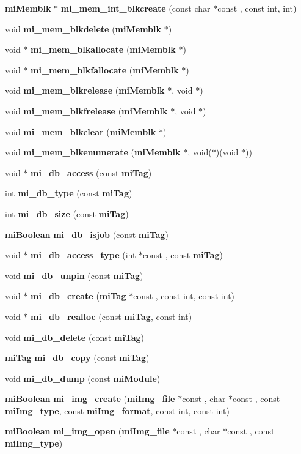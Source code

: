\begin{CompactItemize}
\item 
{\bf mi\-Memblk} $\ast$ {\bf mi\_\-mem\_\-int\_\-blkcreate} (const char $\ast$const , const int, int)
\item 
void {\bf mi\_\-mem\_\-blkdelete} ({\bf mi\-Memblk} $\ast$)
\item 
void $\ast$ {\bf mi\_\-mem\_\-blkallocate} ({\bf mi\-Memblk} $\ast$)
\item 
void $\ast$ {\bf mi\_\-mem\_\-blkfallocate} ({\bf mi\-Memblk} $\ast$)
\item 
void {\bf mi\_\-mem\_\-blkrelease} ({\bf mi\-Memblk} $\ast$, void $\ast$)
\item 
void {\bf mi\_\-mem\_\-blkfrelease} ({\bf mi\-Memblk} $\ast$, void $\ast$)
\item 
void {\bf mi\_\-mem\_\-blkclear} ({\bf mi\-Memblk} $\ast$)
\item 
void {\bf mi\_\-mem\_\-blkenumerate} ({\bf mi\-Memblk} $\ast$, void($\ast$)(void $\ast$))
\item 
void $\ast$ {\bf mi\_\-db\_\-access} (const {\bf mi\-Tag})
\item 
int {\bf mi\_\-db\_\-type} (const {\bf mi\-Tag})
\item 
int {\bf mi\_\-db\_\-size} (const {\bf mi\-Tag})
\item 
{\bf mi\-Boolean} {\bf mi\_\-db\_\-isjob} (const {\bf mi\-Tag})
\item 
void $\ast$ {\bf mi\_\-db\_\-access\_\-type} (int $\ast$const , const {\bf mi\-Tag})
\item 
void {\bf mi\_\-db\_\-unpin} (const {\bf mi\-Tag})
\item 
void $\ast$ {\bf mi\_\-db\_\-create} ({\bf mi\-Tag} $\ast$const , const int, const int)
\item 
void $\ast$ {\bf mi\_\-db\_\-realloc} (const {\bf mi\-Tag}, const int)
\item 
void {\bf mi\_\-db\_\-delete} (const {\bf mi\-Tag})
\item 
{\bf mi\-Tag} {\bf mi\_\-db\_\-copy} (const {\bf mi\-Tag})
\item 
void {\bf mi\_\-db\_\-dump} (const {\bf mi\-Module})
\item 
{\bf mi\-Boolean} {\bf mi\_\-img\_\-create} ({\bf mi\-Img\_\-file} $\ast$const , char $\ast$const , const {\bf mi\-Img\_\-type}, const {\bf mi\-Img\_\-format}, const int, const int)
\item 
{\bf mi\-Boolean} {\bf mi\_\-img\_\-open} ({\bf mi\-Img\_\-file} $\ast$const , char $\ast$const , const {\bf mi\-Img\_\-type})
\item 

\end{CompactItemize}
